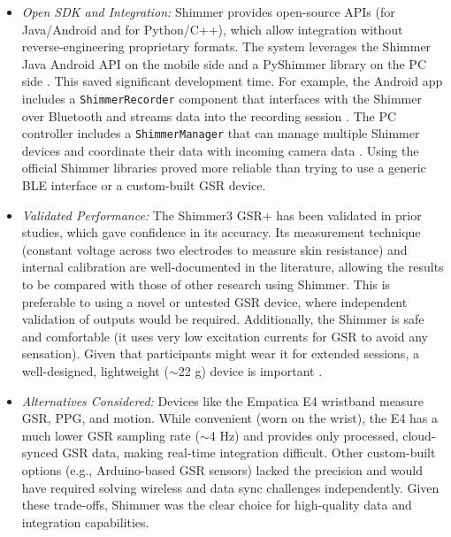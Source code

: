 \begin{itemize}
    \item \emph{Open SDK and Integration:} Shimmer provides open-source APIs (for Java/Android and for Python/C++), which allow integration without reverse-engineering proprietary formats. The system leverages the Shimmer Java Android API on the mobile side and a PyShimmer library on the PC side \cite{ref15}. This saved significant development time. For example, the Android app includes a \texttt{ShimmerRecorder} component that interfaces with the Shimmer over Bluetooth and streams data into the recording session \cite{ref15}. The PC controller includes a \texttt{ShimmerManager} that can manage multiple Shimmer devices and coordinate their data with incoming camera data \cite{ref15}. Using the official Shimmer libraries proved more reliable than trying to use a generic BLE interface or a custom-built GSR device.
    \item \emph{Validated Performance:} The Shimmer3 GSR+ has been validated in prior studies, which gave confidence in its accuracy. Its measurement technique (constant voltage across two electrodes to measure skin resistance) and internal calibration are well-documented in the literature, allowing the results to be compared with those of other research using Shimmer. This is preferable to using a novel or untested GSR device, where independent validation of outputs would be required. Additionally, the Shimmer is safe and comfortable (it uses very low excitation currents for GSR to avoid any sensation). Given that participants might wear it for extended sessions, a well-designed, lightweight ($\sim$22 g) device is important \cite{ref8}.
    \item \emph{Alternatives Considered:} Devices like the Empatica E4 wristband measure GSR, PPG, and motion. While convenient (worn on the wrist), the E4 has a much lower GSR sampling rate ($\sim$4 Hz) and provides only processed, cloud-synced GSR data, making real-time integration difficult. Other custom-built options (e.g., Arduino-based GSR sensors) lacked the precision and would have required solving wireless and data sync challenges independently. Given these trade-offs, Shimmer was the clear choice for high-quality data and integration capabilities.
\end{itemize}

